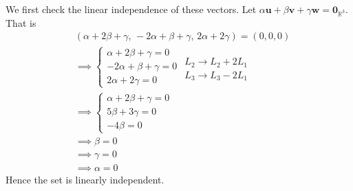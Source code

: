 \documentclass[usenames,dvipsnames,aspectratio=169,10pt]{beamer}
\numberwithin{equation}{section}
\begin{document}
\begin{frame}
We first check the linear independence of these vectors. Let $\alpha \mathbf{u} +  \beta \mathbf{v} + \gamma \mathbf{w} = \mathbf{0}_{\mathbb{R}^3}$. That is
\begin{align*}
& (\alpha + 2\beta + \gamma, \, -2\alpha + \beta + \gamma, \, 2\alpha + 2\gamma) = (0,0,0) \\
%
%
& \implies  \begin{cases}
\alpha + 2\beta + \gamma = 0 \\
-2\alpha + \beta + \gamma = 0 \\
2\alpha + 2\gamma = 0 
\end{cases}
\begin{matrix}
\, \\
L_2 \to L_2 + 2L_1 \\
L_3 \to L_3 - 2L_1 
\end{matrix} \\
%
%
& \implies  \begin{cases}
\alpha + 2\beta + \gamma = 0 \\
5\beta + 3\gamma = 0 \\
-4\beta = 0 
\end{cases} \\
%
%
& \implies \beta = 0 \\
& \implies \gamma = 0 \\
& \implies \alpha = 0
\end{align*}
Hence the set is linearly independent. 
\end{frame}
\end{document}

